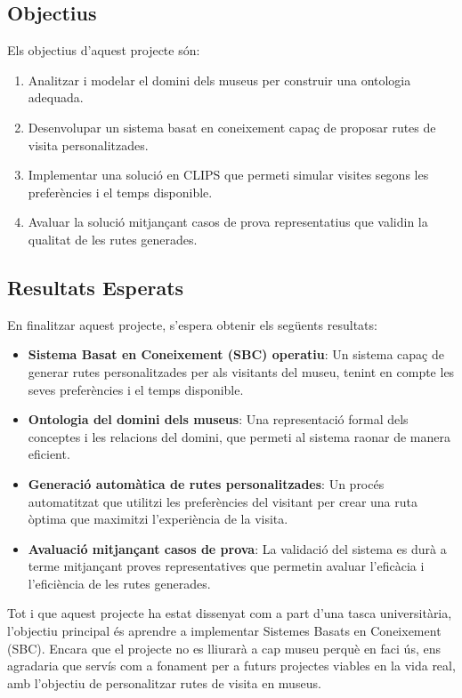 \documentclass[a4paper]{article}
\begin{document}
	\subsection{Objectius}
	
	Els objectius d’aquest projecte són:
	\begin{enumerate}
		\item Analitzar i modelar el domini dels museus per construir una ontologia adequada.
		\item Desenvolupar un sistema basat en coneixement capaç de proposar rutes de visita personalitzades.
		\item Implementar una solució en CLIPS que permeti simular visites segons les preferències i el temps disponible.
		\item Avaluar la solució mitjançant casos de prova representatius que validin la qualitat de les rutes generades.
	\end{enumerate}
	
	\subsection{Resultats Esperats}
	
	En finalitzar aquest projecte, s’espera obtenir els següents resultats:
	
	\begin{itemize}
		\item \textbf{Sistema Basat en Coneixement (SBC) operatiu}: Un sistema capaç de generar rutes personalitzades per als visitants del museu, tenint en compte les seves preferències i el temps disponible.
		
		\item \textbf{Ontologia del domini dels museus}: Una representació formal dels conceptes i les relacions del domini, que permeti al sistema raonar de manera eficient.
		
		\item \textbf{Generació automàtica de rutes personalitzades}: Un procés automatitzat que utilitzi les preferències del visitant per crear una ruta òptima que maximitzi l'experiència de la visita.
		
		\item \textbf{Avaluació mitjançant casos de prova}: La validació del sistema es durà a terme mitjançant proves representatives que permetin avaluar l'eficàcia i l'eficiència de les rutes generades.
	\end{itemize}
	
	Tot i que aquest projecte ha estat dissenyat com a part d'una tasca universitària, l'objectiu principal és aprendre a implementar Sistemes Basats en Coneixement (SBC). Encara que el projecte no es lliurarà a cap museu perquè en faci ús, ens agradaria que servís com a fonament per a futurs projectes viables en la vida real, amb l'objectiu de personalitzar rutes de visita en museus.
	
\end{document}
